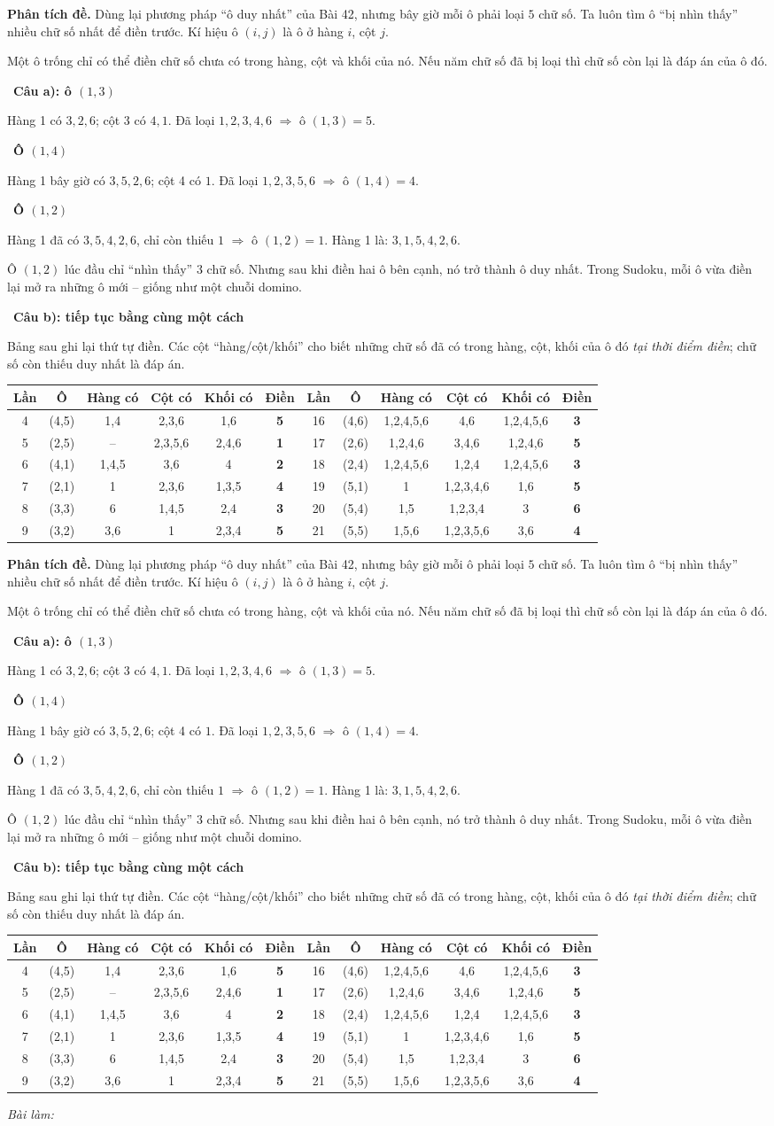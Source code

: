 \documentclass[11pt]{article}
\newif\ifsol \soltrue
\renewcommand{\arraystretch}{1.35}
\newcommand{\StuProb}[2]{\begin{probboxS}{#1}{#2}\StuProbBody\end{probboxS}}
\newcommand{\probsol}[1]{%
  \begin{lrbox}{\solmeasure}\begin{minipage}{\dimexpr\linewidth-24pt\relax}#1\end{minipage}\end{lrbox}%
  \ifsol
    \begin{solbox}#1\end{solbox}%
  \else
    \setlength{\solht}{\dimexpr\ht\solmeasure+\dp\solmeasure+0.85cm\relax}%
    \ifdim\solht<1.35cm\setlength{\solht}{1.35cm}\fi
    \ifdim\solht>\StudentMaxWork\setlength{\solht}{\StudentMaxWork}\fi
    \par\noindent\begin{minipage}{\linewidth}%
    \expandafter\StuProb\StuProbArgs
    \begin{tcolorbox}[colback=white,colframe=Line,boxrule=0.8pt,arc=5pt,
      left=8pt,right=8pt,top=4pt,bottom=4pt,height=\solht]{\footnotesize\color{Slate}\itshape\WorkWord}\end{tcolorbox}%
    \end{minipage}\par\medskip
  \fi}
\newlength{\StudentMaxWork}\setlength{\StudentMaxWork}{4.5cm}
\newcommand{\step}[2]{\par\smallskip\noindent{\bfseries\color{tmBlue!85!black}\StepWord~#1.}\ {\bfseries #2}\par\nopagebreak}
\def\WorkWord{Bài làm:}
\def\StepWord{Bước}
\begin{document}
\probsol{
\textbf{Phân tích đề.} Dùng lại phương pháp ``ô duy nhất'' của Bài 42, nhưng bây giờ mỗi ô phải loại $5$ chữ số. Ta luôn tìm ô
``bị nhìn thấy'' nhiều chữ số nhất để điền trước. Kí hiệu ô $(i, j)$ là ô ở hàng $i$, cột $j$.
\begin{recallbox}Một ô trống chỉ có thể điền chữ số chưa có trong hàng, cột và khối của nó. Nếu năm chữ số đã bị loại thì chữ số còn
lại là đáp án của ô đó.\end{recallbox}
\step{1}{Câu a): ô $(1,3)$}
Hàng 1 có $3, 2, 6$; cột 3 có $4, 1$. Đã loại $1, 2, 3, 4, 6$ $\Rightarrow$ ô $(1,3) = 5$.
\step{2}{Ô $(1,4)$}
Hàng 1 bây giờ có $3, 5, 2, 6$; cột 4 có $1$. Đã loại $1, 2, 3, 5, 6$ $\Rightarrow$ ô $(1,4) = 4$.
\step{3}{Ô $(1,2)$}
Hàng 1 đã có $3, 5, 4, 2, 6$, chỉ còn thiếu $1$ $\Rightarrow$ ô $(1,2) = 1$. Hàng 1 là: $3, 1, 5, 4, 2, 6$.
\begin{tipbox}Ô $(1,2)$ lúc đầu chỉ ``nhìn thấy'' $3$ chữ số. Nhưng sau khi điền hai ô bên cạnh, nó trở thành ô duy nhất. Trong
Sudoku, mỗi ô vừa điền lại mở ra những ô mới -- giống như một chuỗi domino.\end{tipbox}
\step{4}{Câu b): tiếp tục bằng cùng một cách}
Bảng sau ghi lại thứ tự điền. Các cột ``hàng/cột/khối'' cho biết những chữ số đã có trong hàng, cột, khối của ô đó \emph{tại thời
điểm điền}; chữ số còn thiếu duy nhất là đáp án.
\begin{center}\scriptsize
\setlength{\tabcolsep}{3pt}\renewcommand{\arraystretch}{1.12}
\begin{tabular}{|c|c|c|c|c|c||c|c|c|c|c|c|}
\hline
\rowcolor{tmBlue!10} Lần & Ô & Hàng có & Cột có & Khối có & Điền & Lần & Ô & Hàng có & Cột có & Khối có & Điền\\ \hline
4 & (4,5) & 1,4 & 2,3,6 & 1,6 & \textbf{5} & 16 & (4,6) & 1,2,4,5,6 & 4,6 & 1,2,4,5,6 & \textbf{3}\\ \hline
5 & (2,5) & -- & 2,3,5,6 & 2,4,6 & \textbf{1} & 17 & (2,6) & 1,2,4,6 & 3,4,6 & 1,2,4,6 & \textbf{5}\\ \hline
6 & (4,1) & 1,4,5 & 3,6 & 4 & \textbf{2} & 18 & (2,4) & 1,2,4,5,6 & 1,2,4 & 1,2,4,5,6 & \textbf{3}\\ \hline
7 & (2,1) & 1 & 2,3,6 & 1,3,5 & \textbf{4} & 19 & (5,1) & 1 & 1,2,3,4,6 & 1,6 & \textbf{5}\\ \hline
8 & (3,3) & 6 & 1,4,5 & 2,4 & \textbf{3} & 20 & (5,4) & 1,5 & 1,2,3,4 & 3 & \textbf{6}\\ \hline
9 & (3,2) & 3,6 & 1 & 2,3,4 & \textbf{5} & 21 & (5,5) & 1,5,6 & 1,2,3,5,6 & 3,6 & \textbf{4}\\ \hline

\end{tabular}
\end{center}}
\end{document}
